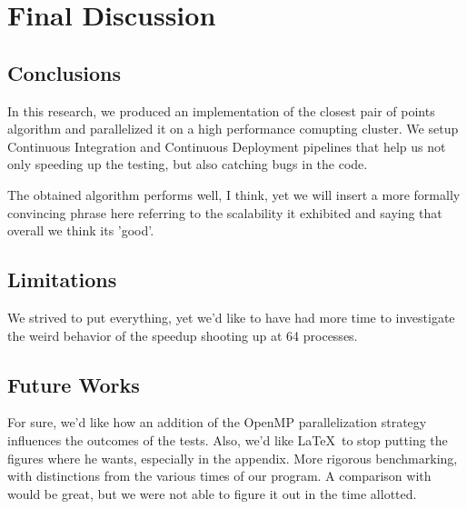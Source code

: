 \section{Final Discussion}
\label{sec:final_discussion}

\subsection{Conclusions}
In this research, we produced an implementation of the closest pair of points algorithm and parallelized it on a high performance comupting cluster.
We setup Continuous Integration and Continuous Deployment pipelines that help us not only speeding up the testing, but also catching bugs in the code.

The obtained algorithm performs well, I think, yet we will insert a more formally convincing phrase here referring to the scalability it exhibited and saying that overall we think its 'good'.

\subsection{Limitations}
We strived to put everything, yet we'd like to have had more time to investigate the weird behavior of the speedup shooting up at 64 processes.

\subsection{Future Works}
For sure, we'd like how an addition of the OpenMP parallelization strategy influences the outcomes of the tests.
Also, we'd like \LaTeX~to stop putting the figures where he wants, especially in the appendix.
More rigorous benchmarking, with distinctions from the various times of our program.
A comparison with \cite{wang2020parallel} would be great, but we were not able to figure it out in the time allotted.
